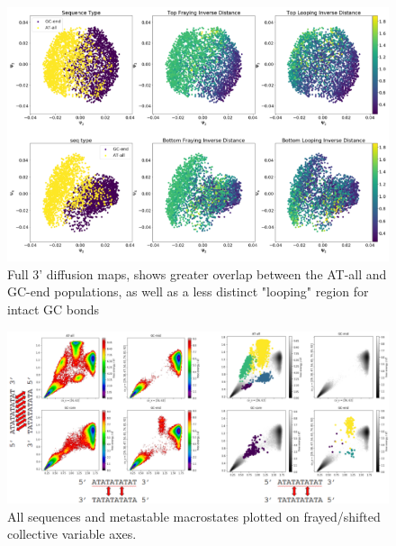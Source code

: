 \documentclass[journal=jpcbfk,manuscript=article]{achemso}
\begin{document}
\begin{figure}[ht!]
	\begin{center}
        \includegraphics[width=\textwidth]{Figs/figs_0804/GC-end_dmaps_3prime.PNG}
        \caption{Full 3' diffusion maps, shows greater overlap between the AT-all and GC-end populations, as well as a less distinct "looping" region for intact GC bonds}
        \label{fig:GC-end_dmaps_3prime}
	\end{center}
\end{figure}


\begin{figure}[ht!]
	\begin{center}
        \includegraphics[width=\textwidth]{Figs/figs_0804/all_seq_physical_cvs_labels.PNG}
        \caption{All sequences and metastable macrostates plotted on frayed/shifted collective variable axes.}
        \label{fig:all_seq_physical_cvs_labels}
	\end{center}
\end{figure}
\end{document}
